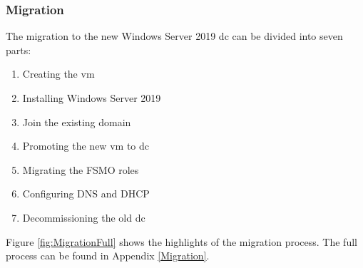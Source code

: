 \subsubsection{Migration}
The migration to the new Windows Server 2019 \acrshort{dc} can be divided into seven parts:
\begin{enumerate}
	\item Creating the \acrshort{vm}
	\item Installing Windows Server 2019
	\item Join the existing domain
	\item Promoting the new \acrshort{vm} to \acrshort{dc}
	\item Migrating the FSMO roles
	\item Configuring DNS and DHCP
	\item Decommissioning the old \acrshort{dc} 
\end{enumerate}
Figure \ref{fig:MigrationFull} shows the highlights of the migration process. The full process can be found in Appendix \ref{Migration}. 

